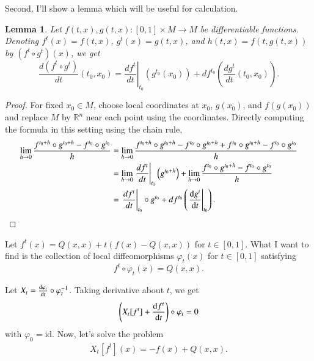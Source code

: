 \documentclass[a4paper, 12pt]{article}
\theoremstyle{Mydefinition}
\theoremstyle{Mytheorem}
\newtheorem{lemma}[statement]{Lemma}
\begin{document}
Second, I'll show a lemma which will be useful for calculation.
\begin{lemma}
Let $f(t,x), g(t,x):[0,1]\times M\rightarrow M$ be differentiable functions. Denoting $f^t(x)=f(t,x)$, $g^t(x) = g(t,x)$, and $h(t,x) = f(t, g(t,x))$ by $(f^t\circ g^t)(x)$, we get
\begin{equation*}
    \frac{d\left(f^t\circ g^t\right)}{dt}(t_0, x_0) = \left.\frac{df^t}{dt}\right|_{t_0}\left(g^{t_0}(x_0)\right) + df^{t_0}\left(\frac{dg^t}{dt}(t_0, x_0)\right).
\end{equation*}
\end{lemma}
\begin{proof}
For fixed $x_0\in M$, choose local coordinates at $x_0$, $g(x_0)$, and $f(g(x_0))$ and replace $M$ by $\mathbb{R}^n$ near each point using the coordinates. Directly computing the formula in this setting using the chain rule,
\begin{equation*}
\begin{split}
    \lim_{h\rightarrow 0}\frac{f^{t_0+h}\circ g^{t_0+h} - f^{t_0}\circ g^{t_0}}{h} &= \lim_{h\rightarrow 0}\frac{f^{t_0+h}\circ g^{t_0+h} - f^{t_0}\circ g^{t_0+h} + f^{t_0}\circ g^{t_0+h} - f^{t_0}\circ g^{t_0}}{h}\\
    &=\lim_{h\rightarrow 0}\left.\frac{df^{t}}{dt}\right|_{t_0}\left(g^{t_0+h}\right) + \lim_{h\rightarrow 0}\frac{f^{t_0}\circ g^{t_0+h} - f^{t_0}\circ g^{t_0}}{h}\\
    &=\left.\frac{df^t}{dt}\right|_{t_0}\circ g^{t_0} + df^{t_0}\left(\left.\dv{g^t}{t}\right|_{t_0}\right).
\end{split}
\end{equation*}
\end{proof}

Let $f^t(x) = Q(x,x)+t(f(x)-Q(x,x))$ for $t\in[0,1]$. What I want to find is the collection of local diffeomorphisms $\varphi_t(x)$ for $t\in [0,1]$ satisfying
\begin{equation*}
    f^t\circ \varphi_t(x) = Q(x,x).
\end{equation*}

Let $X_t = \dv{\varphi_t}{t}\circ \varphi_t^{-1}$. Taking derivative about $t$, we get
\begin{equation*}
    \left(X_t[f^t] + \dv{f^t}{t}\right)\circ \varphi_t= 0
\end{equation*}
with $\varphi_0 = \textrm{id}$. Now, let's solve the problem
\begin{equation}\label{HW6:1_Eq1}
    \begin{split}
        X_t[f^t](x) = -f(x)+Q(x,x).
    \end{split}
\end{equation}
\end{document}
